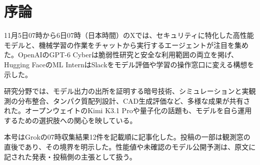 \section{序論}
11月5日07時から6日07時（日本時間）のXでは、セキュリティに特化した高性能モデルと、機械学習の作業をチャットから実行するエージェントが注目を集めた。OpenAIのGPT-6 Cyberは脆弱性研究と安全な利用範囲の両立を掲げ、Hugging FaceのML InternはSlackをモデル評価や学習の操作窓口に変える構想を示した。

研究分野では、モデル出力の出所を証明する暗号技術、シミュレーションと実観測の分布整合、タンパク質配列設計、CAD生成評価など、多様な成果が共有された。オープンウェイトのKimi K3.1 Proや量子化の話題も、モデルを自ら運用するための選択肢への関心を映している。

本号はGrokの07時収集結果12件を記載順に記事化した。投稿の一部は観測窓の直後であり、その境界を明示した。性能値や未確認のモデル公開予測は、原文に記された発表・投稿側の主張として扱う。
